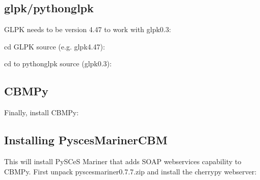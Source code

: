 \documentclass[letterpaper,10pt,english]{sphinxmanual}
\begin{document}
\subsection{glpk/python\sphinxhyphen{}glpk}
\label{\detokenize{install_doc:id2}}
\sphinxAtStartPar
GLPK needs to be version 4.47 to work with glpk\sphinxhyphen{}0.3:

\begin{sphinxVerbatim}[commandchars=\\\{\}]
   
\end{sphinxVerbatim}

\sphinxAtStartPar
cd GLPK source (e.g. glpk\sphinxhyphen{}4.47):

\begin{sphinxVerbatim}[commandchars=\\\{\}]
 
 
  
 
\end{sphinxVerbatim}

\sphinxAtStartPar
cd to python\sphinxhyphen{}glpk source (glpk\sphinxhyphen{}0.3):

\begin{sphinxVerbatim}[commandchars=\\\{\}]
  
\end{sphinxVerbatim}


\subsection{CBMPy}
\label{\detokenize{install_doc:cbmpy}}
\sphinxAtStartPar
Finally, install CBMPy:

\begin{sphinxVerbatim}[commandchars=\\\{\}]
   
   
\end{sphinxVerbatim}


\subsection{Installing PyscesMarinerCBM}
\label{\detokenize{install_doc:installing-pyscesmarinercbm}}
\sphinxAtStartPar
This will install PySCeS Mariner that adds SOAP web\sphinxhyphen{}services
capability to CBMPy. First unpack pyscesmariner\sphinxhyphen{}0.7.7.zip and install
the cherrypy webserver:
\end{document}
